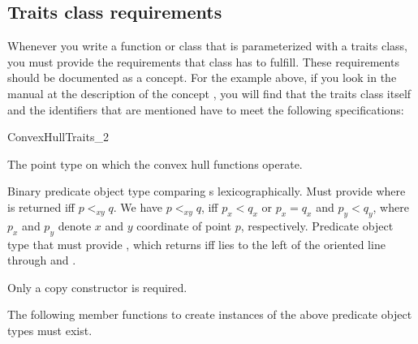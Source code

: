\subsection{Traits class requirements}
\label{subsec:traits_class_requirements}

Whenever you write a function or class that is  parameterized with a traits
class, you must provide the requirements that class has to fulfill. These
requirements should be documented as a concept.  For the
example above, if you look in the manual at the description of the concept
, you will find  that the
traits class itself and the identifiers that are mentioned have to meet the 
following specifications:

\begin{ccRefConcept}{ConvexHullTraits_2}
\ccTypes
\ccAutoIndexingOff
{}

%
       {The point type on which the convex hull functions operate.}

%
       {Binary predicate object type comparing s
        lexicographically.  Must provide
         where 
        is returned iff $p <_{xy} q$.
        We have $p<_{xy}q$, iff $p_x < q_x$ or $p_x = q_x$ and $p_y < q_y$,
        where $p_x$ and $p_y$ denote $x$ and $y$ coordinate of point $p$,
        respectively.
       }
%
       {Predicate object type that must provide
        , which
        returns  iff  lies to the left of the
        oriented line through  and .}
\ccCreation
{}  %

Only a copy constructor is required.


\ccOperations
The following member functions to create instances of the above predicate
object types must exist.

\setlength\parskip{0mm}
\ccGlue
{}

\end{ccRefConcept}
\ccAutoIndexingOn

